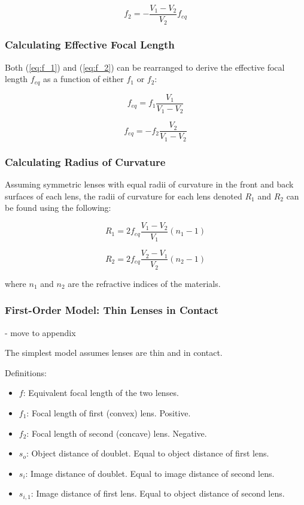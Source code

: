 \begin{equation}
    \label{eq:f_2}
    f_2 = -\frac{V_1-V_2}{V_2}f_{eq}
\end{equation}

\subsubsection{Calculating Effective Focal Length}

Both (\eqref{eq:f_1}) and (\eqref{eq:f_2}) can be rearranged to derive the effective focal length $f_{eq}$ as a function of either $f_1$ or $f_2$:

\begin{equation}
    f_{eq} = f_1\frac{V_1}{V_1-V_2}
\end{equation}

\begin{equation}
    f_{eq} = -f_2\frac{V_2}{V_1-V_2}
\end{equation}

\subsubsection{Calculating Radius of Curvature}

Assuming symmetric lenses with equal radii of curvature in the front and back surfaces of each lens, the radii of curvature for each lens denoted $R_1$ and $R_2$ can be found using the following:

\begin{equation}
    R_1 = 2f_{eq}\frac{V_1-V_2}{V_1}(n_1-1)
\end{equation}

\begin{equation}
    R_2 = 2f_{eq}\frac{V_2-V_1}{V_2}(n_2-1)
\end{equation}

where $n_1$ and $n_2$ are the refractive indices of the materials.

\subsubsection{First-Order Model: Thin Lenses in Contact} - move to appendix

The simplest model assumes lenses are thin and in contact.

Definitions:
\begin{itemize}
    \item $f$: Equivalent focal length of the two lenses.
    \item $f_1$: Focal length of first (convex) lens. Positive.
    \item $f_2$: Focal length of second (concave) lens. Negative.
    \item $s_o$: Object distance of doublet. Equal to object distance of first lens.
    \item $s_i$: Image distance of doublet. Equal to image distance of second lens.
    \item $s_{i,1}$: Image distance of first lens. Equal to object distance of second lens.
\end{itemize}

